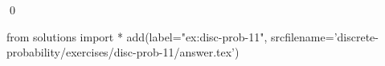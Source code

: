 
\begin{ex} 
  \label{ex:disc-prob-11}
  
  \qed
\end{ex} 
\begin{python0}
from solutions import *
add(label="ex:disc-prob-11",
    srcfilename='discrete-probability/exercises/disc-prob-11/answer.tex') 
\end{python0}
